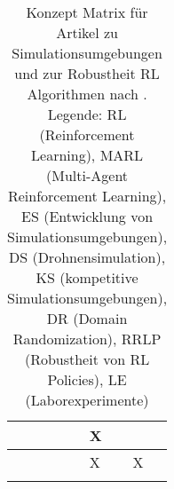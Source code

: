 \begin{longtable}{|l|llllllll|}
    \cite[]{Pan.2021}             & \multicolumn{1}{l|}{}   & \multicolumn{1}{l|}{}    & \multicolumn{1}{l|}{}   & \multicolumn{1}{l|}{}   & \multicolumn{1}{l|}{X}   & \multicolumn{1}{l|}{}   & \multicolumn{1}{l|}{}     &    \\ \hline
    \cite[]{Zhai.2022}            & \multicolumn{1}{l|}{}   & \multicolumn{1}{l|}{}    & \multicolumn{1}{l|}{}   & \multicolumn{1}{l|}{}   & \multicolumn{1}{l|}{X}   & \multicolumn{1}{l|}{}   & \multicolumn{1}{l|}{X}     &   \\ \hline
    \caption{Konzept Matrix für Artikel zu Simulationsumgebungen und zur Robustheit RL Algorithmen nach \cite[]{10.5555/2017160.2017162}.
    Legende: RL (Reinforcement Learning), MARL (Multi-Agent Reinforcement Learning), ES (Entwicklung von Simulationsumgebungen), DS (Drohnensimulation), KS (kompetitive Simulationsumgebungen), DR (Domain Randomization), RRLP (Robustheit von RL Policies), LE (Laborexperimente)}
    \label{tab:research-table}\\
\end{longtable}